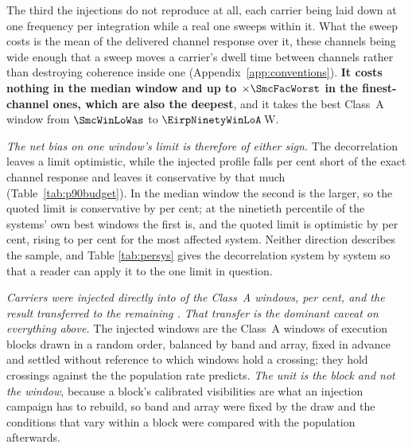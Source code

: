 The third the injections do not reproduce at all, each carrier being laid
down at one frequency per integration while a real one sweeps within it. What
the sweep costs is the mean of the delivered channel response over it, these
channels being wide enough that a sweep moves a carrier's dwell time between
channels rather than destroying coherence inside one
(Appendix~\ref{app:conventions}). \textbf{It costs nothing in the median
window and up to $\times\SmcFacWorst$ in the \SmcNAbove{} finest-channel
ones, which are also the deepest}, and it takes the best Class~A window from
$\SmcWinLoWas$ to $\EirpNinetyWinLoA$\,W.

\emph{The net bias on one window's limit is therefore of either sign.} The
decorrelation leaves a limit optimistic, while the injected profile falls
\InjShortPct{} per cent short of the exact channel response and leaves it
conservative by that much (Table~\ref{tab:p90budget}). In the median window
the second is the larger, so the quoted limit is conservative by
\NmNetConsPct{} per cent; at the ninetieth percentile of the systems' own
best windows the first is, and the quoted limit is optimistic by
\NmNetOptPct{} per cent, rising to \NmNetOptMaxPct{} per cent for the most
affected system. Neither direction describes the sample, and Table
\ref{tab:persys} gives the decorrelation system by system so that a reader
can apply it to the one limit in question.

\emph{Carriers were injected directly into \SensNInj{} of the \NWinA{}
Class~A windows, \SensNInjPct{} per cent, and the result transferred to the
remaining \SensNTransfer. That transfer is the dominant caveat on everything
above.} The injected windows are the Class~A windows of execution blocks
drawn in a random order, balanced by band and array, fixed in advance and
settled without reference to which windows hold a crossing; they hold
\SensNCrossAch{} crossings against the \SensNCrossExp{} the population rate
predicts. \emph{The unit is the block and not the window}, because a block's
calibrated visibilities are what an injection campaign has to rebuild, so
band and array were fixed by the draw and the conditions that vary within a
block were compared with the population afterwards.

